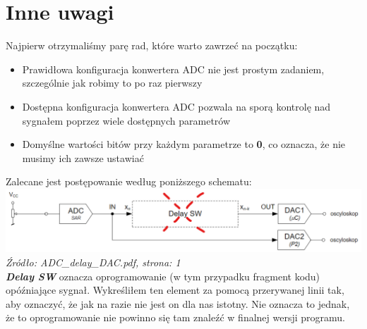\documentclass{article}
\begin{document}
\section{Inne uwagi}
Najpierw otrzymaliśmy parę rad, które warto zawrzeć na początku:
\begin{itemize}
    \item Prawidłowa konfiguracja konwertera ADC nie jest prostym zadaniem, szczególnie jak robimy to po raz pierwszy
    \item Dostępna konfiguracja konwertera ADC pozwala na sporą kontrolę nad sygnałem poprzez wiele dostępnych parametrów
    \item Domyślne wartości bitów przy każdym parametrze to \textbf{0}, co oznacza, że nie musimy ich zawsze ustawiać
\end{itemize}
Zalecane jest postępowanie według poniższego schematu:
\vspace{3mm} \\
\includegraphics[width=\textwidth]{"../adc_img/ADC_delay_DAC_1.png"}
\textit{Źródło: ADC\_delay\_DAC.pdf, strona: 1}
\vspace{3mm} \\
\textbf{\textit{Delay SW}} oznacza oprogramowanie (w tym przypadku fragment kodu) opóźniające sygnał.
Wykreśliłem ten element za pomocą przerywanej linii tak, aby oznaczyć, że jak na razie nie jest on dla nas istotny.
Nie oznacza to jednak, że to oprogramowanie nie powinno się tam znaleźć w finalnej wersji programu.
\end{document}

